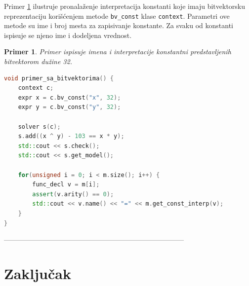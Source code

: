 \documentclass[12pt,oneside]{memoir}
\newtheorem{primer}{Primer}
\begin{document}
Primer \ref{ex6} ilustruje pronalaženje interpretacija konstanti koje imaju bitvektorsku reprezentaciju korišćenjem metode \texttt{bv\_const} klase \texttt{context}. Parametri ove metode su ime i broj mesta za zapisivanje konstante. Za svaku od konstanti ispisuje se njeno ime i dodeljena vrednost.

\begin{primer} \label{ex6} Primer ispisuje imena i interpretacije konstantni predstavljenih bitvektorom dužine 32.
\begin{lstlisting}[language=C++]
void primer_sa_bitvektorima() {
    context c;
    expr x = c.bv_const("x", 32);
    expr y = c.bv_const("y", 32);

    solver s(c);
    s.add((x ^ y) - 103 == x * y);
    std::cout << s.check();
    std::cout << s.get_model();
    
    for(unsigned i = 0; i < m.size(); i++) {
        func_decl v = m[i];
        assert(v.arity() == 0); 
        std::cout << v.name() << "=" << m.get_const_interp(v);
    }
}

\end{lstlisting}
\end{primer}



------------------------------------------------------------------------------

\chapter{Zaključak}


\literatura

\backmatter

\begin{biografija}
  
\end{biografija}
\end{document}
